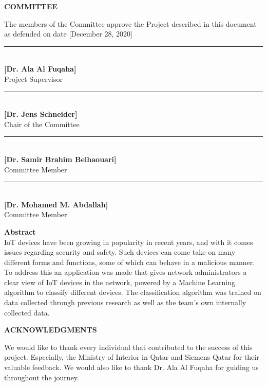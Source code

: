 \documentclass{article}
\begin{document}
\center
\large
\textbf{COMMITTEE}\\
\vspace{0.5cm}
\begin{flushleft}
The members of the Committee approve the Project described in this document as defended on date [\hspace{1cm}December 28, 2020\hspace{1cm}]
\end{flushleft}
\vspace{3cm}
\begin{flushright}
\noindent\rule{6.5cm}{0.4pt}\\
\textbf{[Dr. Ala Al Fuqaha]}\\
Project Supervisor\\
\vspace{0.5cm}
\noindent\rule{6.5cm}{0.4pt}\\
\textbf{[Dr. Jens Schneider]}\\
Chair of the Committee\\
\vspace{0.5cm}
\noindent\rule{6.5cm}{0.4pt}\\
\textbf{[Dr. Samir Brahim Belhaouari]}\\
Committee Member\\
\vspace{0.5cm}
\noindent\rule{6.5cm}{0.4pt}\\
\textbf{[Dr. Mohamed M. Abdallah]}\\
Committee Member
\end{flushright}
\pagebreak
{}
\center
\large
\textbf{Abstract}\\

\justify
IoT devices have been growing in popularity in recent years, and with it comes issues regarding security and safety. Such devices can come take on many different forms and functions, some of which can behave in a malicious manner. To address this an application was made that gives network administrators a clear view of IoT devices in the network, powered by a Machine Learning algorithm to classify different devices. The classification algorithm was trained on data collected through previous research as well as the team’s own internally collected data.
\pagebreak
\begin{center}
    \tableofcontents
\end{center}
\pagebreak 
{}
\listoffigures
\pagebreak
{}
\center
\large
\textbf{ACKNOWLEDGMENTS}\\
\begin{center}
We would like to thank every individual that contributed to the success of this project. Especially, the Ministry of Interior in Qatar and Siemens Qatar for their valuable feedback. We would also like to thank Dr. Ala Al Fuqaha for guiding us throughout the journey. 
\end{center}
\end{document}
